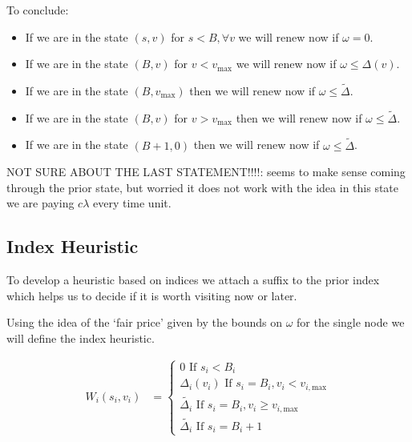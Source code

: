 \documentclass[a4paper,10pt]{article}
\theoremstyle{definition}
\theoremstyle{definition}
\theoremstyle{remark}
\theoremstyle{definition}
\begin{document}
To conclude:
\begin{itemize}
\item If we are in the state $(s,v)$ for $s < B , \forall v$ we will renew now if $\omega=0$.
\item If we are in the state $(B,v)$ for $v < v_{\text{max}}$ we will renew now if $\omega \leq \Delta(v)$.
\item If we are in the state $(B,v_{\text{max}})$ then we will renew now if $\omega \leq \widetilde{\Delta}$.
\item If we are in the state $(B,v)$ for $v > v_{\text{max}}$ then we will renew now if $\omega \leq \widetilde{\Delta}$.
\item If we are in the state $(B+1,0)$ then we will renew now if $\omega \leq \widetilde{\Delta}$.
\end{itemize}

NOT SURE ABOUT THE LAST STATEMENT!!!!: seems to make sense coming through the prior state, but worried it does not work with the idea in this state we are paying $c \lambda$ every time unit.



\subsection{Index Heuristic}
To develop a heuristic based on indices we attach a suffix to the prior index which helps us to decide if it is worth visiting now or later.

Using the idea of the `fair price' given by the bounds on $\omega$ for the single node we will define the index heuristic.

\begin{align}
W_{i}(s_{i},v_{i})&=\begin{cases}
0 \text{ If } s_{i}<B_{i} \\
\Delta_{i}(v_{i}) \text{ If } s_{i}=B_{i} , v_{i}<v_{i,\text{max}} \\
\widetilde{\Delta_{i}} \text{ If } s_{i}=B_{i} , v_{i} \geq v_{i,\text{max}} \\
\widetilde{\Delta_{i}} \text{ If } s_{i}=B_{i}+1
\end{cases}
\end{align}
\end{document}
